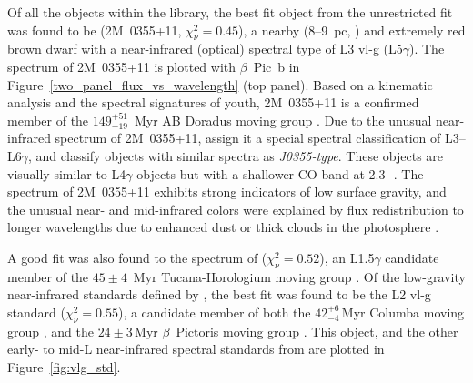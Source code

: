 \documentclass[twocolumn]{aastex6}
\begin{document}
Of all the objects within the library, the best fit object from the unrestricted fit was found to be  (2M~0355+11, $\chi^2_{\nu} = 0.45$), a nearby (8--9~pc, \citealp{Faherty:2013bc,Liu:2013ej}) and extremely red \citep{2009AJ....137.3345C} brown dwarf with a near-infrared (optical) spectral type of L3 {\sc vl-g} (L5$\gamma$). The spectrum of 2M~0355+11 is plotted with $\beta$~Pic~b in Figure~\ref{two_panel_flux_vs_wavelength} (top panel). Based on a kinematic analysis and the spectral signatures of youth, 2M~0355+11 is a confirmed member of the $149^{+51}_{-19}$~Myr \citep{Bell2015} AB Doradus moving group \citep{Faherty:2016fx}. Due to the unusual near-infrared spectrum of 2M~0355+11, \citet{Gagne:2015dc} assign it a special spectral classification of L3--L6$\gamma$, and classify objects with similar spectra as {\it J0355-type}. These objects are visually similar to L4$\gamma$ objects but with a shallower CO band at 2.3\,\micron\ \citep{Gagne:2015dc}. The spectrum of 2M~0355+11 exhibits strong indicators of low surface gravity, and the unusual near- and mid-infrared colors were explained by flux redistribution to longer wavelengths due to enhanced dust or thick clouds in the photosphere \citep{Faherty:2013bc, Faherty:2016fx}.

A good fit was also found to the spectrum of  ($\chi^2_{\nu}=0.52$), an L1.5$\gamma$ candidate member of the $45\pm4$~Myr \citep{Bell2015} Tucana-Horologium moving group \citep{Gagne:2015dc}. Of the low-gravity near-infrared standards defined by \citet{Allers2013}, the best fit was found to be the L2 {\sc vl-g} standard  ($\chi^2_{\nu} = 0.55$), a candidate member of both the $42^{+6}_{-4}$\,Myr \citep{Bell2015} Columba moving group \citep{Gagne:2014gp,Gagne:2015dc}, and the $24\pm3$\,Myr \citep{Bell2015} $\beta$~Pictoris moving group \citep{Faherty:2016fx}. This object, and the other early- to mid-L near-infrared spectral standards from \citet{Allers2013} are plotted in Figure~\ref{fig:vlg_std}.


\begin{figure*}
\caption{The best fit object to the spectrum of $\beta$~Pic~b within the spectral library for the unrestricted (top panel, \citealp{Allers2013}) and restricted (bottom panel, \citealp{Kirkpatrick:2010dc}) fits. The optical and near-infrared spectral type and gravity classifications are given for both objects.}
\label{two_panel_flux_vs_wavelength}
\end{figure*}
\end{document}
